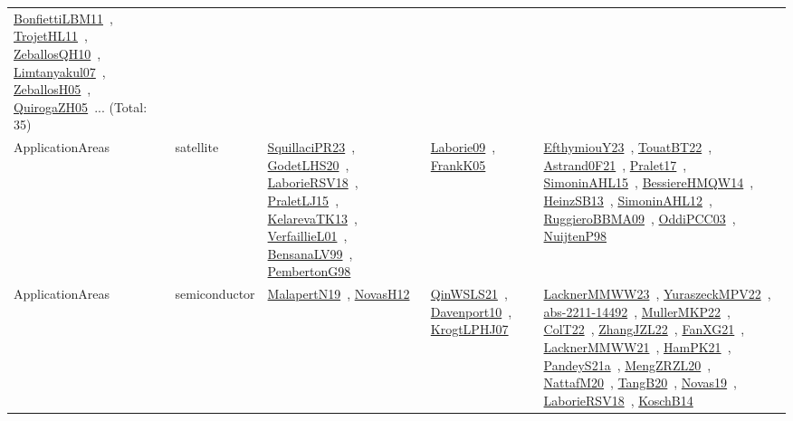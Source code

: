 {\begin{longtable}{lp{3cm}>{\raggedright\arraybackslash}p{6cm}>{\raggedright\arraybackslash}p{6cm}>{\raggedright\arraybackslash}p{8cm}}
\href{papers/BonfiettiLBM11.pdf}{BonfiettiLBM11}~\cite{BonfiettiLBM11}, \href{articles/TrojetHL11.pdf}{TrojetHL11}~\cite{TrojetHL11}, \href{articles/ZeballosQH10.pdf}{ZeballosQH10}~\cite{ZeballosQH10}, \href{papers/Limtanyakul07.pdf}{Limtanyakul07}~\cite{Limtanyakul07}, \href{articles/ZeballosH05.pdf}{ZeballosH05}~\cite{ZeballosH05}, \href{papers/QuirogaZH05.pdf}{QuirogaZH05}~\cite{QuirogaZH05}... (Total: 35)\\
ApplicationAreas & satellite & \href{papers/SquillaciPR23.pdf}{SquillaciPR23}~\cite{SquillaciPR23}, \href{papers/GodetLHS20.pdf}{GodetLHS20}~\cite{GodetLHS20}, \href{articles/LaborieRSV18.pdf}{LaborieRSV18}~\cite{LaborieRSV18}, \href{papers/PraletLJ15.pdf}{PraletLJ15}~\cite{PraletLJ15}, \href{papers/KelarevaTK13.pdf}{KelarevaTK13}~\cite{KelarevaTK13}, \href{papers/VerfaillieL01.pdf}{VerfaillieL01}~\cite{VerfaillieL01}, \href{articles/BensanaLV99.pdf}{BensanaLV99}~\cite{BensanaLV99}, \href{papers/PembertonG98.pdf}{PembertonG98}~\cite{PembertonG98} & \href{papers/Laborie09.pdf}{Laborie09}~\cite{Laborie09}, \href{papers/FrankK05.pdf}{FrankK05}~\cite{FrankK05} & \href{papers/EfthymiouY23.pdf}{EfthymiouY23}~\cite{EfthymiouY23}, \href{papers/TouatBT22.pdf}{TouatBT22}~\cite{TouatBT22}, \href{papers/Astrand0F21.pdf}{Astrand0F21}~\cite{Astrand0F21}, \href{papers/Pralet17.pdf}{Pralet17}~\cite{Pralet17}, \href{articles/SimoninAHL15.pdf}{SimoninAHL15}~\cite{SimoninAHL15}, \href{papers/BessiereHMQW14.pdf}{BessiereHMQW14}~\cite{BessiereHMQW14}, \href{articles/HeinzSB13.pdf}{HeinzSB13}~\cite{HeinzSB13}, \href{papers/SimoninAHL12.pdf}{SimoninAHL12}~\cite{SimoninAHL12}, \href{articles/RuggieroBBMA09.pdf}{RuggieroBBMA09}~\cite{RuggieroBBMA09}, \href{papers/OddiPCC03.pdf}{OddiPCC03}~\cite{OddiPCC03}, \href{articles/NuijtenP98.pdf}{NuijtenP98}~\cite{NuijtenP98}\\
ApplicationAreas & semiconductor & \href{papers/MalapertN19.pdf}{MalapertN19}~\cite{MalapertN19}, \href{articles/NovasH12.pdf}{NovasH12}~\cite{NovasH12} & \href{articles/QinWSLS21.pdf}{QinWSLS21}~\cite{QinWSLS21}, \href{papers/Davenport10.pdf}{Davenport10}~\cite{Davenport10}, \href{papers/KrogtLPHJ07.pdf}{KrogtLPHJ07}~\cite{KrogtLPHJ07} & \href{articles/LacknerMMWW23.pdf}{LacknerMMWW23}~\cite{LacknerMMWW23}, \href{articles/YuraszeckMPV22.pdf}{YuraszeckMPV22}~\cite{YuraszeckMPV22}, \href{articles/abs-2211-14492.pdf}{abs-2211-14492}~\cite{abs-2211-14492}, \href{articles/MullerMKP22.pdf}{MullerMKP22}~\cite{MullerMKP22}, \href{articles/ColT22.pdf}{ColT22}~\cite{ColT22}, \href{papers/ZhangJZL22.pdf}{ZhangJZL22}~\cite{ZhangJZL22}, \href{articles/FanXG21.pdf}{FanXG21}~\cite{FanXG21}, \href{papers/LacknerMMWW21.pdf}{LacknerMMWW21}~\cite{LacknerMMWW21}, \href{articles/HamPK21.pdf}{HamPK21}~\cite{HamPK21}, \href{articles/PandeyS21a.pdf}{PandeyS21a}~\cite{PandeyS21a}, \href{articles/MengZRZL20.pdf}{MengZRZL20}~\cite{MengZRZL20}, \href{papers/NattafM20.pdf}{NattafM20}~\cite{NattafM20}, \href{papers/TangB20.pdf}{TangB20}~\cite{TangB20}, \href{articles/Novas19.pdf}{Novas19}~\cite{Novas19}, \href{articles/LaborieRSV18.pdf}{LaborieRSV18}~\cite{LaborieRSV18}, \href{papers/KoschB14.pdf}{KoschB14}~\cite{KoschB14}\\

\end{longtable}}
